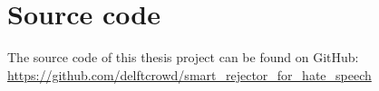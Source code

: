 \chapter{Source code}
\label{sec:appendix-C}
The source code of this thesis project can be found on GitHub:\\
\url{https://github.com/delftcrowd/smart_rejector_for_hate_speech}